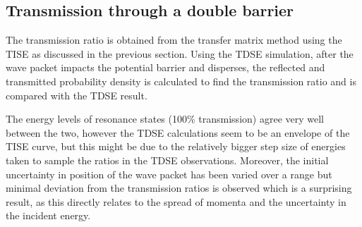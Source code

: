\documentclass{article}
\begin{document}
\subsection{Transmission through a double barrier}
The transmission ratio is obtained from the transfer matrix method using the TISE as discussed in the previous section. Using the TDSE simulation, after the wave packet impacts the potential barrier and disperses, the reflected and transmitted probability density is calculated to find the transmission ratio and is compared with the TDSE result.

\begin{figure}[h!]
\centering
{}
\qquad
{}
\end{figure}

The energy levels of resonance states (100\% transmission) agree very well between the two, however the TDSE calculations seem to be an envelope of the TISE curve, but this might be due to the relatively bigger step size of energies taken to sample the ratios in the TDSE observations. Moreover, the initial uncertainty in position of the wave packet has been varied over a range but minimal deviation from the transmission ratios is observed which is a surprising result, as this directly relates to the spread of momenta and the uncertainty in the incident energy. 

\newpage
\end{document}
